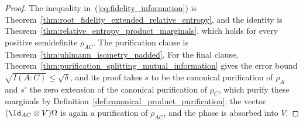 \begin{proof}\leanok
    The inequality in~(\ref{eq:fidelity_information}) is
    Theorem~\ref{thm:root_fidelity_extended_relative_entropy}, and the
    identity is Theorem~\ref{thm:relative_entropy_product_marginals}, which
    holds for every positive semidefinite $\rho_{AC}$. The purification
    clause is Theorem~\ref{thm:uhlmann_isometry_padded}. For the final
    clause, Theorem~\ref{thm:purification_splitting_mutual_information}
    gives the error bound $\sqrt{I(A{:}C)}\le\sqrt\delta$, and its proof
    takes $s$ to be the canonical purification of $\rho_A$ and $s'$ the
    zero extension of the canonical purification of $\rho_C$, which purify
    these marginals by Definition~\ref{def:canonical_product_purification};
    the vector
    $(\Id_{AC}\otimes V)\Omega$ is again a purification of $\rho_{AC}$,
    and the phase is absorbed into $V$.
\end{proof}
